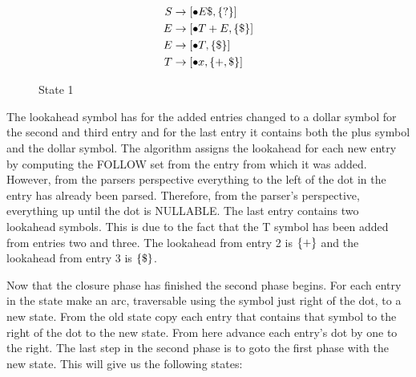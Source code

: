 \begin{figure}[htp!]
\begin{equation*}
  \begin{split}
      S &\rightarrow [\bullet E\$, \left\{?\right\}]\\
      E &\rightarrow [\bullet T+E, \left\{\$\right\}] \\
      E &\rightarrow [\bullet T, \left\{\$\right\}] \\
      T &\rightarrow [\bullet x, \left\{+,\$\right\}] \\
  \end{split}
\end{equation*}
\caption*{State 1}
\end{figure}

The lookahead symbol has for the added entries changed to a dollar symbol for the second and third entry and for the last entry it contains both the plus symbol and the dollar symbol. The algorithm assigns the lookahead for each new entry by computing the FOLLOW set from the entry from which it was added. However, from the parsers perspective everything to the left of the dot in the entry has already been parsed. Therefore, from the parser's perspective, everything up until the dot is NULLABLE. The last entry contains two lookahead symbols. This is due to the fact that the T symbol has been added from entries two and three. The lookahead from entry 2 is $\left\{+\right\}$ and the lookahead from entry 3 is $\left\{\$\right\}$. 

Now that the closure phase has finished the second phase begins. For each entry in the state make an arc, traversable using the symbol just right of the dot, to a new state. From the old state copy each entry that contains that symbol to the right of the dot to the new state. From here advance each entry's dot by one to the right. The last step in the second phase is to goto the first phase with the new state. This will give us the following states:

